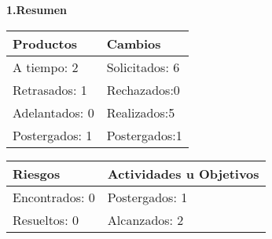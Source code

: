 \documentclass[12pt]{report}
\numberwithin{equation}{section}
\begin{document}
\begin{flushleft}

\textbf{1.Resumen}\\

\begin{table}[H]
\centering
\begin{tabular}{|m{5cm}|m{5cm}|}
\hline
\textbf{Productos} & \textbf{Cambios}\\
\hline \hline
\small{A tiempo: 2 }&\small{ Solicitados: 6}\\
\hline
\small{Retrasados: 1}& \small{Rechazados:0}\\
\hline
\small{Adelantados: 0}& \small{Realizados:5}\\
\hline
\small{Postergados: 1}& \small{Postergados:1}\\
\hline
\end{tabular}
\end{table}

\begin{table}[H]
\centering
\begin{tabular}{|m{5cm}|m{5cm}|}
\hline
\textbf{Riesgos} & \textbf{Actividades u Objetivos}\\
\hline \hline
\small{Encontrados: 0}& \small{Postergados: 1}\\
\hline
\small{Resueltos: 0} & \small{Alcanzados: 2}\\
\hline
\end{tabular}
\label{tabla: TABLA CE ResumenCierre}
\end{table}

\end{flushleft}
\end{document}
